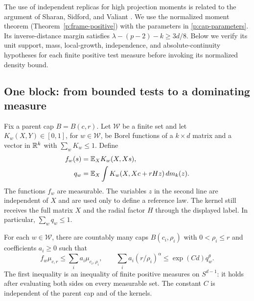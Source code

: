The use of independent replicas for high projection moments is related
to the argument of Sharan, Sidford, and Valiant
\cite[Section~7, Lemma~12]{SSV2019}. We use the normalized moment theorem
(Theorem~\ref{p:frame-positive}) with the parameters in
\eqref{p:cap-parameters}. Its inverse-distance margin satisfies
$\lambda-(p-2)-k\ge3d/8$. Below we verify its unit support, mass,
local-growth, independence, and absolute-continuity hypotheses for each
finite positive test measure before invoking its normalized density bound.

\subsection{One block: from bounded tests to a dominating measure}

Fix a parent cap $B=B(c,r)$.  Let $\mathcal W$ be a finite set and let
$K_w(X,Y)\in[0,1]$, for $w\in\mathcal W$, be Borel functions of a
$k\times d$ matrix and a vector in $\mathbb R^k$ with $\sum_wK_w\le1$.
Define
\begin{equation}\label{p:cap-reference-probabilities}
 \begin{split}
 f_w(s)&=\mathbb E_X K_w(X,Xs),\\
 q_w&=\mathbb E_X\int K_w(X,Xc+rHz)\,dm_k(z).
 \end{split}
\end{equation}
The functions $f_w$ are measurable.  The variables $z$ in the second
line are independent of $X$ and are used only to define a reference law.
The kernel still receives the full matrix $X$ and the radial factor $H$
through the displayed label.  In particular, $\sum_wq_w\le1$.

\begin{proposition}
\label{p:cap-domination}
For each $w\in\mathcal W$, there are countably many caps
$B(c_i,\rho_i)$ with $0<\rho_i\le r$ and coefficients $a_i\ge0$ such
that
\begin{equation}\label{p:cap-domination-bound}
 f_w\mu_{c,r}\le\sum_i a_i\mu_{c_i,\rho_i},
 \qquad
 \sum_i a_i(r/\rho_i)^\alpha\le\exp(Cd)q_w^\theta.
\end{equation}
The first inequality is an inequality of finite positive measures on
$S^{d-1}$: it holds after evaluating both sides on every measurable set.
The constant $C$ is independent of the parent cap and of the kernels.
\end{proposition}

